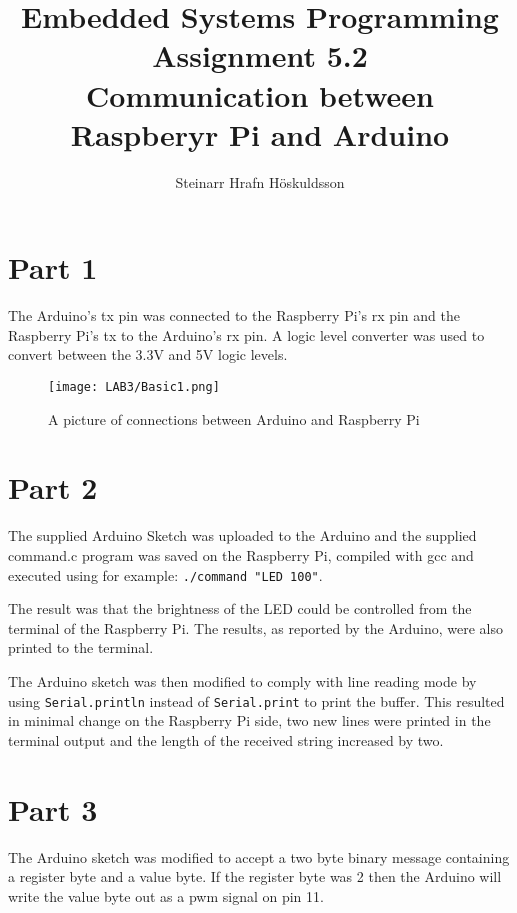 \documentclass{article}
\title{Embedded Systems Programming \\ Assignment 5.2 \\ \large Communication between Raspberyr Pi and Arduino}
\author{Steinarr Hrafn Höskuldsson}
\newcommand{\mycomment}[1]{}
\begin{document}
\pagestyle{firststyle}
{\let\newpage\relax\maketitle}

\mycomment{
\begin{figure}[h]
    \centering
    \texttt{[image: LAB3/Basic1.png]}
    \caption{"Switch test" Breadboard set up}
    \label{fig:Switch_test}
\end{figure}



}


\section*{Part 1}
The Arduino's tx pin was connected to the Raspberry Pi's rx pin and the Raspberry Pi's tx to the Arduino's rx pin. A logic level converter was used to convert between the 3.3V and 5V logic levels.

\begin{figure}[h]
    \centering
    \texttt{[image: LAB3/Basic1.png]}
    \caption{A picture of connections between Arduino and Raspberry Pi}
    \label{fig:part1}
\end{figure}

\section*{Part 2}
The supplied Arduino Sketch was uploaded to the Arduino and the supplied command.c program was saved on the Raspberry Pi, compiled with gcc and executed using for example: \verb!./command "LED 100"!. 

The result was that the brightness of the LED could be controlled from the terminal of the Raspberry Pi. The results, as reported by the Arduino, were also printed to the terminal.

The Arduino sketch was then modified to comply with line reading mode by using \verb!Serial.println! instead of \verb!Serial.print! to print the buffer. This resulted in minimal change on the Raspberry Pi side, two new lines were printed in the terminal output and the length of the received string increased by two.

\section*{Part 3}
The Arduino sketch was modified to accept a two byte binary message containing a register byte and a value byte. If the register byte was 2 then the Arduino will write the value byte out as a pwm signal on pin 11.
\end{document}
